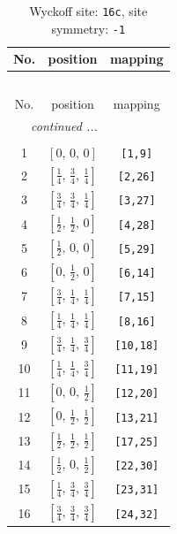\documentclass[fleqn,8pt]{jsarticle}
\begin{document}
\begin{longtable}{ccc}
\caption{Wyckoff site: {\tt 16c}, site symmetry: {\tt -1}}
 \\
 \hline \hline
No. & position & mapping \\ \hline \endfirsthead

\multicolumn{2}{l}{\tablename\ \thetable{}} \\
 \hline \hline
No. & position & mapping \\ \hline \endhead

 \hline \hline
\multicolumn{2}{r}{\footnotesize\it continued ...} \\ \endfoot

 \hline \hline
\multicolumn{2}{r}{} \\ \endlastfoot

1 & $\left[ 0,\, 0,\, 0 \right]$ & {\tt [1,9]} \\ \hline
2 & $\left[ \frac{1}{4},\, \frac{3}{4},\, \frac{1}{4} \right]$ & {\tt [2,26]} \\ \hline
3 & $\left[ \frac{3}{4},\, \frac{3}{4},\, \frac{1}{4} \right]$ & {\tt [3,27]} \\ \hline
4 & $\left[ \frac{1}{2},\, \frac{1}{2},\, 0 \right]$ & {\tt [4,28]} \\ \hline
5 & $\left[ \frac{1}{2},\, 0,\, 0 \right]$ & {\tt [5,29]} \\ \hline
6 & $\left[ 0,\, \frac{1}{2},\, 0 \right]$ & {\tt [6,14]} \\ \hline
7 & $\left[ \frac{3}{4},\, \frac{1}{4},\, \frac{1}{4} \right]$ & {\tt [7,15]} \\ \hline
8 & $\left[ \frac{1}{4},\, \frac{1}{4},\, \frac{1}{4} \right]$ & {\tt [8,16]} \\ \hline
9 & $\left[ \frac{3}{4},\, \frac{1}{4},\, \frac{3}{4} \right]$ & {\tt [10,18]} \\ \hline
10 & $\left[ \frac{1}{4},\, \frac{1}{4},\, \frac{3}{4} \right]$ & {\tt [11,19]} \\ \hline
11 & $\left[ 0,\, 0,\, \frac{1}{2} \right]$ & {\tt [12,20]} \\ \hline
12 & $\left[ 0,\, \frac{1}{2},\, \frac{1}{2} \right]$ & {\tt [13,21]} \\ \hline
13 & $\left[ \frac{1}{2},\, \frac{1}{2},\, \frac{1}{2} \right]$ & {\tt [17,25]} \\ \hline
14 & $\left[ \frac{1}{2},\, 0,\, \frac{1}{2} \right]$ & {\tt [22,30]} \\ \hline
15 & $\left[ \frac{1}{4},\, \frac{3}{4},\, \frac{3}{4} \right]$ & {\tt [23,31]} \\ \hline
16 & $\left[ \frac{3}{4},\, \frac{3}{4},\, \frac{3}{4} \right]$ & {\tt [24,32]} \\
\end{longtable}
\end{document}
